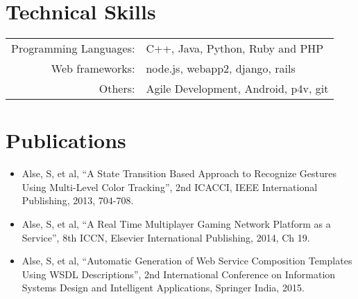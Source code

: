 \documentclass[a4paper]{article} %
\begin{document}
\section{Technical Skills}
\renewcommand{\arraystretch}{1}%
\begin{tabular}{rl}

Programming Languages: &  C++, Java, Python, Ruby and PHP\\
Web frameworks: & node.js, webapp2, django, rails\\
Others: & Agile Development, Android, p4v, git \\
\end{tabular}


\section{Publications}
\begin{itemize}
\item Alse, S, et al, ``A State Transition Based Approach to Recognize Gestures Using Multi-Level Color Tracking'', 2nd ICACCI, IEEE International Publishing, 2013, 704-708.
\item Alse, S, et al, ``A Real Time Multiplayer Gaming Network Platform as a Service'', 8th ICCN, Elsevier International Publishing, 2014, Ch 19.
\item Alse, S, et al, ``Automatic Generation of Web Service Composition Templates Using WSDL Descriptions'', 2nd International Conference on Information Systems Design and Intelligent Applications, Springer India, 2015.
\end{itemize}
\end{document}
